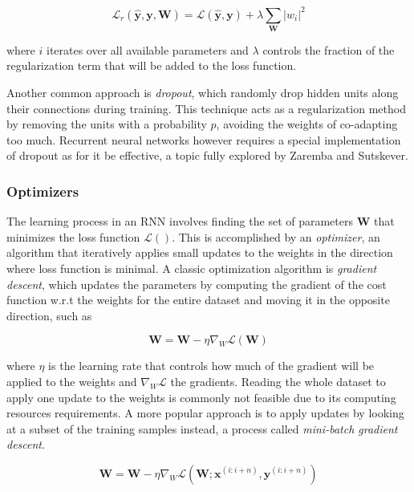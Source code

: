\documentclass{kththesis}
\begin{document}
\begin{equation}
\mathcal{L}_r(\hat{\mathbf{y}}, \mathbf{y}, \mathbf{W}) = \mathcal{L}(\hat{\mathbf{y}}, \mathbf{y}) + \lambda \sum_\mathbf{W} |w_i|^2
\end{equation}
 
where $i$ iterates over all available parameters and $\lambda$ controls the fraction of the regularization term that will be added to the loss function.

Another common approach is \emph{dropout}\citep{srivastava2014dropout}, which randomly drop hidden units along their connections during training. This technique acts as a regularization method by removing the units with a probability $p$, avoiding the weights of co-adapting too much. Recurrent neural networks however requires a special implementation of dropout as for it be effective, a topic fully explored by Zaremba and Sutskever\citep{zaremba2014recurrent}.

\subsubsection{Optimizers}

The learning process in an RNN involves finding the set of parameters $\mathbf{W}$ that minimizes the loss function $\mathcal{L}()$. This is accomplished by an \emph{optimizer}, an algorithm that iteratively applies small updates to the weights in the direction where loss function is minimal. A classic optimization algorithm is \emph{gradient descent}, which updates the parameters by computing the gradient of the cost function w.r.t the weights for the entire dataset and moving it in the opposite direction, such as

\begin{equation}
\mathbf{W} = \mathbf{W} - \eta \nabla_W \mathcal{L}(\mathbf{W}) 
\end{equation}

where $\eta$ is the learning rate that controls how much of the gradient will be applied to the weights and $\nabla_W \mathcal{L}$ the gradients. Reading the whole dataset to apply one update to the weights is commonly not feasible due to its computing resources requirements. A more popular approach is to apply updates by looking at a subset of the training samples instead, a process  called \emph{mini-batch gradient descent}.

\begin{equation}
\mathbf{W} = \mathbf{W} - \eta \nabla_W \mathcal{L}(\mathbf{W}; \mathbf{x}^{(i:i+n)},\mathbf{y}^{(i:i+n)}) 
\end{equation}
\end{document}
